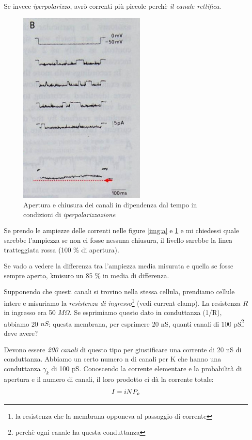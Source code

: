 \documentclass[a4paper,12pt]{article}
\begin{document}
Se invece \emph{iperpolarizzo}, avrò correnti più piccole perchè \emph{il canale rettifica}. 
\begin{figure}[H]
\centering
\includegraphics[scale=0.4]{immagine/tempo_db.jpg}
\caption{Apertura e chiusura dei canali in dipendenza dal tempo in condizioni di \emph{iperpolarizzazione}}
\label{img:b}
\end{figure} 

Se prendo le ampiezze delle correnti nelle figure \ref{img:a} e \ref{img:b} e mi chiedessi quale sarebbe l'ampiezza se non ci fosse nessuna chiusura, il livello sarebbe la linea tratteggiata  rossa (100 \% di apertura).

Se vado a vedere la differenza tra l'ampiezza media misurata e quella se fosse sempre aperto, kmisuro un 85 \% in media di differenza.

Supponendo che questi canali si trovino nella stessa cellula, prendiamo cellule intere e misuriamo la \emph{resistenza di ingresso}\footnote{la resistenza che la membrana opponeva al passaggio di corrente} (vedi current clamp). La resistenza $R$ in ingresso era 50 $M \Omega$. Se esprimiamo questo dato in conduttanza (1/R), abbiamo 20 $nS$: questa membrana, per esprimere 20 nS, quanti canali di 100 pS\footnote{perchè ogni canale ha questa conduttanza} deve avere?

Devono essere \emph{200 canali} di questo tipo per giustificare una corrente di 20 nS di conduttanza. Abbiamo un certo numero n di canali per K che hanno una conduttanza $\gamma_{k}$ di 100 pS. Conoscendo la corrente elementare e la probabilità di apertura e il numero di canali, il loro prodotto ci dà la corrente totale:
\begin{equation}
\centering
I=i N P_{o}
\end{equation}
\end{document}
